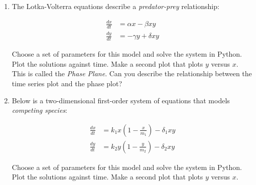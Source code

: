\documentclass[10pt]{article}
\begin{document}
\begin{enumerate}[{$\qquad 1.]
\begin{enumerate}
\end{enumerate}

\pagebreak 

\item The Lotka-Volterra equations describe a \textit{predator-prey} relationship: 

\begin{align*}
\frac{dx}{dt} & = \alpha x - \beta xy \\ 
\frac{dy}{dt} & = -\gamma y + \delta xy \end{align*}

Choose a set of parameters for this model and solve the system in Python.  Plot the solutions against time.  Make a second plot that plots $y$ versus $x$. This is called the \textit{Phase Plane}.  Can you describe the relationship between the time series plot and the phase plot? \vfill
  
\item Below is a two-dimensional first-order system of equations that models \textit{competing species}: 

\begin{align*}
\frac{dx}{dt} & = k_1 x \left( 1 - \frac{x}{m_1} \right) - \delta_1 xy \\ 
\frac{dy}{dt} & = k_2 y \left( 1 - \frac{y}{m_2} \right) - \delta_2 xy \end{align*}

Choose a set of parameters for this model and solve the system in Python.  Plot the solutions against time.  Make a second plot that plots $y$ versus $x$.  \vfill
  

\end{enumerate}
\end{document}
